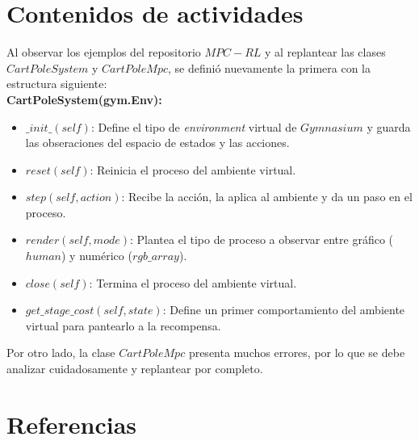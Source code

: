 \documentclass[12pt]{article}
\begin{document}
\section*{Contenidos de actividades}

Al observar los ejemplos del repositorio \href{https://github.com/FilippoAiraldi/mpc-reinforcement-learning/tree/main}{$MPC-RL$} \cite{Airdaldi2023} y al replantear las clases $CartPoleSystem$ y $CartPoleMpc$, se definió nuevamente la primera con la estructura siguiente:\\

\textbf{CartPoleSystem(gym.Env):}
\begin{itemize}
	\item $\_init\_(self)$: Define el tipo de \textit{environment} virtual de $Gymnasium$ y guarda las obseraciones del espacio de estados y las acciones.
	\item $reset(self)$: Reinicia el proceso del ambiente virtual.
	\item $step(self, action)$: Recibe la acción, la aplica al ambiente y da un paso en el proceso.
	\item $render(self, mode)$: Plantea el tipo de proceso a observar entre gráfico ($human$) y numérico ($rgb\_array$).
	\item $close(self)$: Termina el proceso del ambiente virtual.
	\item $get\_stage\_cost(self, state)$: Define un primer comportamiento del ambiente virtual para pantearlo a la recompensa.
\end{itemize}

Por otro lado, la clase $CartPoleMpc$ presenta muchos errores, por lo que se debe analizar cuidadosamente y replantear por completo.

\newpage

\section*{Referencias}
\renewcommand\refname{}


\end{document}
